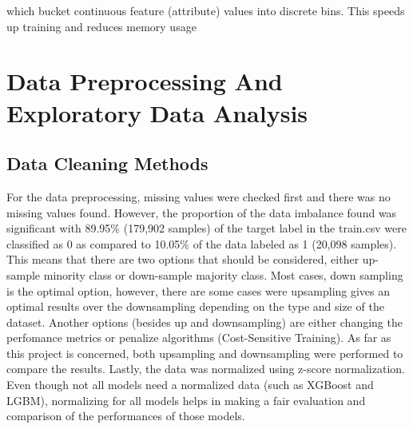 \documentclass[journal,twoside,web]{ieeecolor}
\begin{document}
which bucket continuous feature (attribute) values into discrete bins. This speeds up training and reduces memory usage


\section{Data Preprocessing And Exploratory Data Analysis}


\subsection{Data Cleaning Methods}
For the data preprocessing, missing values were checked first and there was no missing values found. However, the proportion of the data imbalance found was significant with 89.95\% (179,902 samples) of the target label in the train.csv were classified as 0 as compared to 10.05\% of the data labeled as 1 (20,098 samples). This means that there are two options that should be considered, either up-sample minority class or down-sample majority class. Most cases, down sampling is the optimal option, however, there are some cases were upsampling gives an optimal results over the downsampling depending on the type and size of the dataset. Another options (besides up and downsampling) are either changing the perfomance metrics or penalize algorithms (Cost-Sensitive Training). As far as this project is concerned, both upsampling and downsampling were performed to compare the results. Lastly, the data was normalized using z-score normalization. Even though not all models need a normalized data (such as XGBoost and LGBM), normalizing for all models helps in making a fair evaluation and comparison of the performances of those models. 

\end{document}
